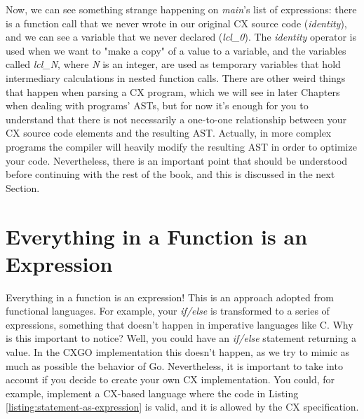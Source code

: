 \documentclass[11pt,fleqn,openany]{book} %
\begin{document}
Now, we can see something strange happening on \textit{main}'s list of expressions: there is a function call that we never wrote in our original CX source code (\textit{identity}), and we can see a variable that we never declared (\textit{lcl\_0}). The \textit{identity} operator is used when we want to "make a copy" of a value to a variable, and the variables called \textit{lcl\_N}, where \textit{N} is an integer, are used as temporary variables that hold intermediary calculations in nested function calls. There are other weird things that happen when parsing a CX program, which we will see in later Chapters when dealing with programs' ASTs, but for now it's enough for you to understand that there is not necessarily a one-to-one relationship between your CX source code elements and the resulting AST. Actually, in more complex programs the compiler will heavily modify the resulting AST in order to optimize your code. Nevertheless, there is an important point that should be understood before continuing with the rest of the book, and this is discussed in the next Section.

\section{Everything in a Function is an Expression}


Everything in a function is an expression! This is an approach adopted from functional languages. For example, your \textit{if/else} is transformed to a series of expressions, something that doesn't happen in imperative languages like C. Why is this important to notice? Well, you could have an \textit{if/else} statement returning a value. In the CXGO implementation this doesn't happen, as we try to mimic as much as possible the behavior of Go. Nevertheless, it is important to take into account if you decide to create your own CX implementation. You could, for example, implement a CX-based language where the code in Listing \ref{listing:statement-as-expression} is valid, and it is allowed by the CX specification.
\end{document}
